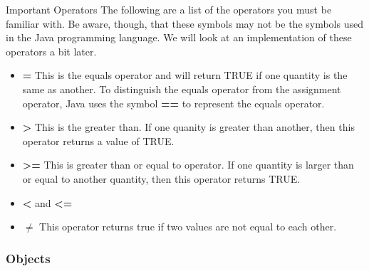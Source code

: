 	\begin{positiveInformation}{Important Operators}
		The following are a list of the operators you must be familiar with. Be aware, though, that these symbols may not be the symbols used in the Java programming language. We will look at an implementation of these operators a bit later.
			\begin{itemize}
				\item \textbf{=} This is the equals operator and will return TRUE if one quantity is the same as another. To distinguish the equals operator from the assignment operator, Java uses the symbol \textbf{==} to represent the equals operator.
				\item \textbf{>} This is the greater than. If one quanity is greater than another, then this operator returns a value of TRUE.
				\item \textbf{>=} This is greater than or equal to operator. If one quantity is larger than or equal to another quantity, then this operator returns TRUE.
				\item \textbf{<} and \textbf{<=}
				\item \textbf{$\neq$} This operator returns true if two values are not equal to each other.
			\end{itemize}
	\end{positiveInformation}
\subsubsection*{Objects}

